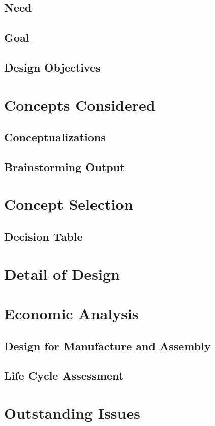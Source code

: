 \documentclass{article}
\begin{document}
\subsection{Need}

\subsection{Goal}

\subsection{Design Objectives}



\section{Concepts Considered}
\subsection{Conceptualizations}

\subsection{Brainstorming Output}


\section{Concept Selection}
\subsection{Decision Table}

\section{Detail of Design}

\section{Economic Analysis}
\subsection{Design for Manufacture and Assembly}

\subsection{Life Cycle Assessment}


\section{Outstanding Issues}
\end{document}
